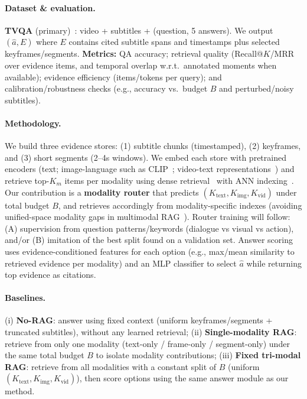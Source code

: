 \documentclass{article}
\begin{document}
\vspace{-2pt}
\paragraph{Dataset \& evaluation.}
\textbf{TVQA} (primary)~\cite{lei2018tvqa}: video + subtitles + (question, 5 answers).
We output $(\hat{a},E)$ where $E$ contains cited subtitle spans and timestamps plus selected keyframes/segments.
\textbf{Metrics:} QA accuracy; retrieval quality (Recall@$K$/MRR over evidence items, and temporal overlap w.r.t.\ annotated moments when available); evidence efficiency (items/tokens per query); and calibration/robustness checks (e.g., accuracy vs.\ budget $B$ and perturbed/noisy subtitles).

\vspace{-2pt}
\paragraph{Methodology.}
We build three evidence stores: (1) subtitle chunks (timestamped), (2) keyframes, and (3) short segments (2--4s windows).
We embed each store with pretrained encoders (text; image-language such as CLIP~\cite{radford2021clip}; video-text representations~\cite{xu2021videoclip,luo2021clip4clip}) and retrieve top-$K_m$ items per modality using dense retrieval~\cite{karpukhin2020dpr} with ANN indexing~\cite{johnson2017faiss}.
Our contribution is a \textbf{modality router} that predicts $(K_{\text{text}},K_{\text{img}},K_{\text{vid}})$ under total budget $B$, and retrieves accordingly from modality-specific indexes (avoiding unified-space modality gaps in multimodal RAG~\cite{yeo2025universalrag}).
Router training will follow: (A) supervision from question patterns/keywords (dialogue vs visual vs action), and/or (B) imitation of the best split found on a validation set.
Answer scoring uses evidence-conditioned features for each option (e.g., max/mean similarity to retrieved evidence per modality) and an MLP classifier to select $\hat{a}$ while returning top evidence as citations.

\vspace{-2pt}
\paragraph{Baselines.}
(i) \textbf{No-RAG}: answer using fixed context (uniform keyframes/segments + truncated subtitles), without any learned retrieval;
(ii) \textbf{Single-modality RAG}: retrieve from only one modality (text-only / frame-only / segment-only) under the same total budget $B$ to isolate modality contributions;
(iii) \textbf{Fixed tri-modal RAG}: retrieve from all modalities with a constant split of $B$ (uniform $(K_{\text{text}},K_{\text{img}},K_{\text{vid}})$), then score options using the same answer module as our method.
\end{document}
